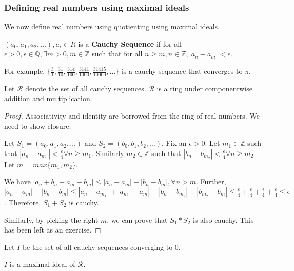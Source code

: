\subsubsection{Defining real numbers using maximal ideals}
We now define real numbers using quotienting using maximal ideals.
\begin{definition} \label{def:cauchy}
  $(a_{0}, a_{1}, a_{2}, \dots ), a_{i} \in R$ is a \textbf{Cauchy Sequence} if for all $\epsilon > 0, \epsilon \in \mathbb{Q}, \exists m > 0, m \in \mathbb{Z}$ such that for all $ n \geq m, n \in \mathbb{Z}, |a_{n} - a_{m} | < \epsilon$.
\end{definition}
For example, $ \{ \frac{3}{1}, \frac{31}{10}, \frac{314}{100}, \frac{3141}{1000}, \frac{31415}{10000}, \dots \}$ is a cauchy sequence that converges to $\pi$.
\begin{theorem} \label{theorem:cauchyring}
  Let $\mathcal{R}$ denote the set of all cauchy sequences.
  $\mathcal{R}$ is a ring under componentwise addition and multiplication.
\end{theorem}
\begin{proof} \label{proof:cauchyring}
  Associativity and identity are borrowed from the ring of real numbers.
  We need to show closure.
  \par
  Let $S_{1} = (a_{0}, a_{1}, a_{2}, \dots )$ and $S_{2} = (b_{0}, b_{1}, b_{2}, \dots ).$
  Fix an $\epsilon > 0$.
  Let $m_{1} \in \mathbb{Z}$ such that $|a_{n} - a_{m_{1}}| < \frac{\epsilon}{4} \forall n \geq m_{1}$.
  Similarly $m_{2} \in \mathbb{Z}$ such that $|b_{n} - b_{m_{2}}| < \frac{\epsilon}{4} \forall n \geq m_{2}$
  Let $m = max \{ m_{1}, m_{2} \}$.
  \par
  We have $|a_{n} + b_{n} - a_{m} - b_{m}| \leq |a_{n} - a_{m}| + |b_{n} - b_{m}|, \forall n > m$.
  Further, $|a_{n} - a_{m}| + |b_{n} - b_{m}| \leq |a_{n} - a_{m_{1}}| + |a_{m_{1}} - a_{m}| + |b_{n} - b_{m_{2}}| + |b_{m_{2}} - b_{m}| \leq \frac{\epsilon}{4} + \frac{\epsilon}{4} + \frac{\epsilon}{4} + \frac{\epsilon}{4} \leq \epsilon$.
  Therefore, $S_{1} + S_{2}$ is cauchy.
  \par
  Similarly, by picking the right $m$, we can prove that $S_{1} * S_{2}$ is also cauchy.
  This has been left as an exercise.
\end{proof}
Let $I$ be the set of all cauchy sequences converging to $0$.
\begin{theorem} \label{theorem:cauchymax}
  $I$ is a maximal ideal of $\mathcal{R}$.
\end{theorem}
